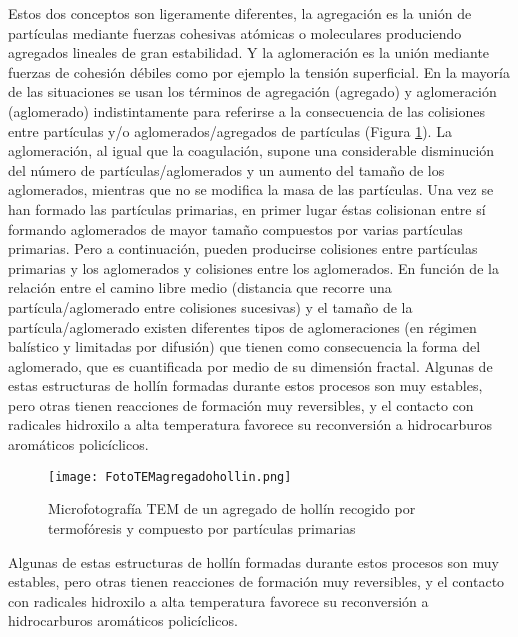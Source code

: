 \par Estos dos conceptos son ligeramente diferentes, la agregación es la unión de partículas mediante fuerzas cohesivas atómicas o moleculares produciendo agregados lineales de gran estabilidad. Y la aglomeración es la unión mediante fuerzas de cohesión débiles como por ejemplo la tensión superficial. En la mayoría de las situaciones se usan los términos de agregación (agregado) y aglomeración (aglomerado) indistintamente para referirse a la consecuencia de las colisiones entre partículas y/o aglomerados/agregados de partículas (Figura \ref{fig:fototemagregadohollin}). La aglomeración, al igual que la coagulación, supone una considerable disminución del número de partículas/aglomerados y un aumento del tamaño de los aglomerados, mientras que no se modifica la masa de las partículas. Una vez se han formado las partículas primarias, en primer lugar éstas colisionan entre sí formando aglomerados de mayor tamaño compuestos por varias partículas primarias. Pero a continuación, pueden producirse colisiones entre partículas primarias y los aglomerados y colisiones entre los aglomerados. En función de la relación entre el camino libre medio (distancia que recorre una partícula/aglomerado entre colisiones sucesivas) y el tamaño de la partícula/aglomerado existen diferentes tipos de aglomeraciones (en régimen balístico y limitadas por difusión) que tienen como consecuencia la forma del aglomerado, que es cuantificada por medio de su dimensión fractal. 
Algunas de estas estructuras de hollín formadas durante estos procesos son muy estables, pero otras tienen reacciones de formación muy reversibles, y el contacto con radicales hidroxilo a alta temperatura favorece su reconversión a hidrocarburos aromáticos policíclicos.

\begin{figure}[ht]
\centering
	\texttt{[image: FotoTEMagregadohollin.png]}	 
	\caption[Microfotografía TEM de un agregado de hollín]{Microfotografía TEM de un agregado de hollín recogido por termofóresis y compuesto por partículas primarias} \label{fig:fototemagregadohollin}
\end{figure} 

\par Algunas de estas estructuras de hollín formadas durante estos procesos son muy estables, pero otras tienen reacciones de formación muy reversibles, y el contacto con radicales hidroxilo a alta temperatura favorece su reconversión a hidrocarburos aromáticos policíclicos.

